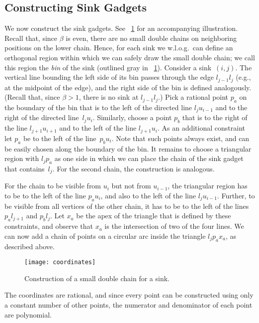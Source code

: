 \documentclass[a4paper,11pt]{article}
\begin{document}
\subsection{Constructing Sink Gadgets}
We now construct the sink gadgets.
See \figurename~\ref{fig_coordinates} for an accompanying illustration.
Recall that, since $\beta$ is even, there are no small double chains on neighboring positions on the lower chain.
Hence, for each sink we w.l.o.g.\ can define an orthogonal region within which we can safely draw the small double chain; we call this region the \emph{bin} of the sink (outlined gray in \figurename~\ref{fig_coordinates}).
Consider a sink~$(i,j)$.
The vertical line bounding the left side of its bin passes through the edge $l_{j-1} l_j$ (e.g., at the midpoint of the edge), and the right side of the bin is defined analogously.
(Recall that, since $\beta > 1$, there is no sink at $l_{j-1} l_j$.)
Pick a rational point $p_a$ on the boundary of the bin that is to the left of the directed line $l_j u_{i-1}$ and to the right of the directed line~$l_j u_i$.
Similarly, choose a point $p_b$ that is to the right of the line $l_{j+1} u_{i+1}$ and to the left of the line $l_{j+1} u_i$.
As an additional constraint let $p_a$ be to the left of the line~$p_b u_i$.
Note that such points always exist, and can be easily chosen along the boundary of the bin.
It remains to choose a triangular region with $l_j p_a$ as one side in which we can place the chain of the sink gadget that contains~$l_j$.
For the second chain, the construction is analogous.

For the chain to be visible from $u_i$ but not from $u_{i-1}$, the triangular region has to be to the left of the line $p_a u_i$, and also to the left of the line $l_j u_{i-1}$.
Further, to be visible from all vertices of the other chain, it has to be to the left of the lines $p_a l_{j+1}$ and $p_b l_j$.
Let $x_a$ be the apex of the triangle that is defined by these constraints, and observe that $x_a$ is the intersection of two of the four lines.
We can now add a chain of points on a circular arc inside the triangle $l_j p_a x_a$, as described above.

\begin{figure}
\centering
\texttt{[image: coordinates]}
\caption{Construction of a small double chain for a sink.}
\label{fig_coordinates}
\end{figure}

The coordinates are rational, and since every point can be constructed using only a constant number of other points, the numerator and denominator of each point are polynomial.
\end{document}
